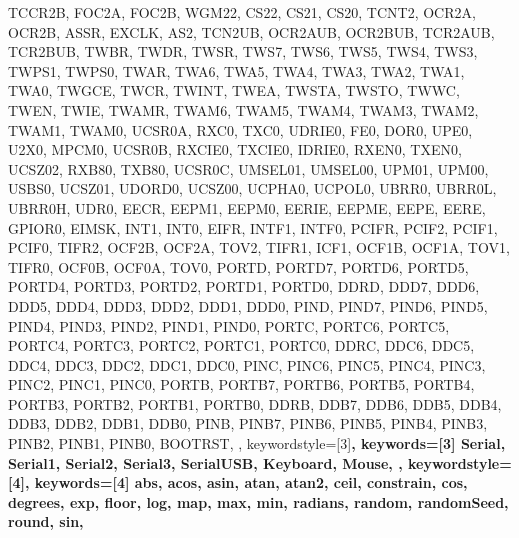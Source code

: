 {{                TCCR2B, FOC2A, FOC2B, WGM22, CS22, CS21, CS20,
                TCNT2, OCR2A, OCR2B,
                ASSR, EXCLK, AS2, TCN2UB, OCR2AUB, OCR2BUB, TCR2AUB, TCR2BUB,
                TWBR, TWDR,
                TWSR, TWS7, TWS6, TWS5, TWS4, TWS3, TWPS1, TWPS0,
                TWAR, TWA6, TWA5, TWA4, TWA3, TWA2, TWA1, TWA0, TWGCE,
                TWCR, TWINT, TWEA, TWSTA, TWSTO, TWWC, TWEN, TWIE,
                TWAMR, TWAM6, TWAM5, TWAM4, TWAM3, TWAM2, TWAM1, TWAM0,
                UCSR0A, RXC0, TXC0, UDRIE0, FE0, DOR0, UPE0, U2X0, MPCM0,
                UCSR0B, RXCIE0, TXCIE0, IDRIE0, RXEN0, TXEN0, UCSZ02, RXB80, TXB80,
                UCSR0C, UMSEL01, UMSEL00, UPM01, UPM00, USBS0, UCSZ01, UDORD0, UCSZ00, UCPHA0, UCPOL0,
                UBRR0, UBRR0L, UBRR0H,
                UDR0,
                EECR, EEPM1, EEPM0, EERIE, EEPME, EEPE, EERE,
                GPIOR0,
                EIMSK, INT1, INT0,
                EIFR, INTF1, INTF0,
                PCIFR, PCIF2, PCIF1, PCIF0,
                TIFR2, OCF2B, OCF2A, TOV2, 
                TIFR1, ICF1, OCF1B, OCF1A, TOV1, 
                TIFR0, OCF0B, OCF0A, TOV0, 
                PORTD, PORTD7, PORTD6, PORTD5, PORTD4, PORTD3, PORTD2, PORTD1, PORTD0, 
                DDRD, DDD7, DDD6, DDD5, DDD4, DDD3, DDD2, DDD1, DDD0, 
                PIND, PIND7, PIND6, PIND5, PIND4, PIND3, PIND2, PIND1, PIND0, 
                PORTC, PORTC6, PORTC5, PORTC4, PORTC3, PORTC2, PORTC1, PORTC0, 
                DDRC, DDC6, DDC5, DDC4, DDC3, DDC2, DDC1, DDC0, 
                PINC, PINC6, PINC5, PINC4, PINC3, PINC2, PINC1, PINC0, 
                PORTB, PORTB7, PORTB6, PORTB5, PORTB4, PORTB3, PORTB2, PORTB1, PORTB0, 
                DDRB, DDB7, DDB6, DDB5, DDB4, DDB3, DDB2, DDB1, DDB0, 
                PINB, PINB7, PINB6, PINB5, PINB4, PINB3, PINB2, PINB1, PINB0, 
                BOOTRST,
                },  
% 
%
  keywordstyle=[3]\bfseries\color{arduinoOrange},
  keywords=[3]{  %
                Serial, Serial1, Serial2, Serial3, SerialUSB, Keyboard, Mouse,
                },      
%
%
  keywordstyle=[4]\color{arduinoOrange},
  keywords=[4]{  %
                abs, acos, asin, atan, atan2, ceil, constrain, cos, degrees, exp, 
                floor, log, map, max, min, radians, random, randomSeed, round, sin, 
}}
